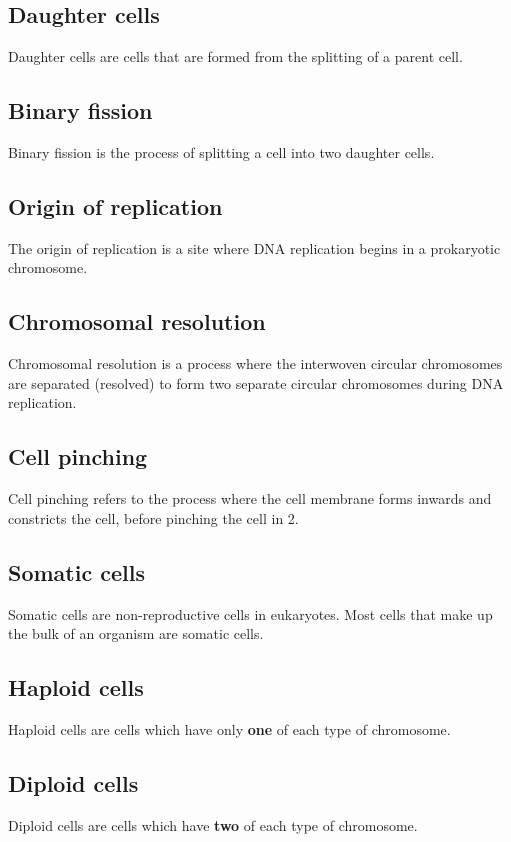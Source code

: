 \documentclass[11pt]{article}
\begin{document}
\subsection{Daughter cells}
\label{sec:org8312221}
Daughter cells are cells that are formed from the splitting of a parent cell.

\subsection{Binary fission}
\label{sec:org6bbecd4}
Binary fission is the process of splitting a cell into two daughter cells.

\subsection{Origin of replication}
\label{sec:org33f66ca}
The origin of replication is a site where DNA replication begins in a prokaryotic chromosome.

\subsection{Chromosomal resolution}
\label{sec:org459da5a}
Chromosomal resolution is a process where the interwoven circular chromosomes are separated (resolved) to form two separate circular chromosomes during DNA replication.

\subsection{Cell pinching}
\label{sec:orgef56a2d}
Cell pinching refers to the process where the cell membrane forms inwards and constricts the cell, before pinching the cell in 2.

\subsection{Somatic cells}
\label{sec:orgb63c44a}
Somatic cells are non-reproductive cells in eukaryotes. Most cells that make up the bulk of an organism are somatic cells.

\subsection{Haploid cells}
\label{sec:orgb9e7a19}
Haploid cells are cells which have only \textbf{one} of each type of chromosome.

\subsection{Diploid cells}
\label{sec:org835e9e1}
Diploid cells are cells which have \textbf{two} of each type of chromosome.
\end{document}
